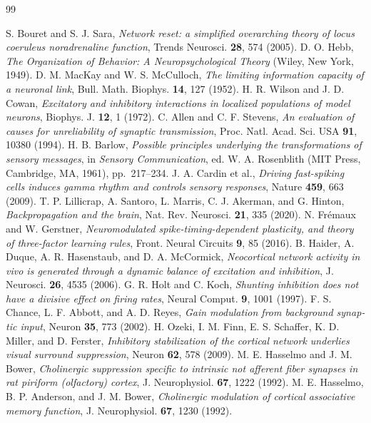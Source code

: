 \begin{thebibliography}{99}
\begin{otherlanguage}{english}
 S. Bouret and S. J. Sara, \emph{Network reset: a simplified overarching theory of locus coeruleus noradrenaline function}, Trends Neurosci. \textbf{28}, 574 (2005).
 D. O. Hebb, \emph{The Organization of Behavior: A Neuropsychological Theory} (Wiley, New York, 1949).
 D. M. MacKay and W. S. McCulloch, \emph{The limiting information capacity of a neuronal link}, Bull. Math. Biophys. \textbf{14}, 127 (1952).
 H. R. Wilson and J. D. Cowan, \emph{Excitatory and inhibitory interactions in localized populations of model neurons}, Biophys. J. \textbf{12}, 1 (1972).
 C. Allen and C. F. Stevens, \emph{An evaluation of causes for unreliability of synaptic transmission}, Proc. Natl. Acad. Sci. USA \textbf{91}, 10380 (1994).
 H. B. Barlow, \emph{Possible principles underlying the transformations of sensory messages}, in \emph{Sensory Communication}, ed. W. A. Rosenblith (MIT Press, Cambridge, MA, 1961), pp.~217--234.
 J. A. Cardin et al., \emph{Driving fast-spiking cells induces gamma rhythm and controls sensory responses}, Nature \textbf{459}, 663 (2009).
 T. P. Lillicrap, A. Santoro, L. Marris, C. J. Akerman, and G. Hinton, \emph{Backpropagation and the brain}, Nat. Rev. Neurosci. \textbf{21}, 335 (2020).
 N. Fr\'emaux and W. Gerstner, \emph{Neuromodulated spike-timing-dependent plasticity, and theory of three-factor learning rules}, Front. Neural Circuits \textbf{9}, 85 (2016).
 B. Haider, A. Duque, A. R. Hasenstaub, and D. A. McCormick, \emph{Neocortical network activity in vivo is generated through a dynamic balance of excitation and inhibition}, J. Neurosci. \textbf{26}, 4535 (2006).
 G. R. Holt and C. Koch, \emph{Shunting inhibition does not have a divisive effect on firing rates}, Neural Comput. \textbf{9}, 1001 (1997).
 F. S. Chance, L. F. Abbott, and A. D. Reyes, \emph{Gain modulation from background synaptic input}, Neuron \textbf{35}, 773 (2002).
 H. Ozeki, I. M. Finn, E. S. Schaffer, K. D. Miller, and D. Ferster, \emph{Inhibitory stabilization of the cortical network underlies visual surround suppression}, Neuron \textbf{62}, 578 (2009).
 M. E. Hasselmo and J. M. Bower, \emph{Cholinergic suppression specific to intrinsic not afferent fiber synapses in rat piriform (olfactory) cortex}, J. Neurophysiol. \textbf{67}, 1222 (1992).
 M. E. Hasselmo, B. P. Anderson, and J. M. Bower, \emph{Cholinergic modulation of cortical associative memory function}, J. Neurophysiol. \textbf{67}, 1230 (1992).

\end{otherlanguage}
\end{thebibliography}
